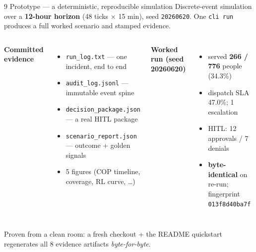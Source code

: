 \documentclass[aspectratio=169,11pt]{beamer}
\begin{document}
\begin{frame}{9 \;\; Prototype --- a deterministic, reproducible simulation}
  \small
  Discrete-event simulation over a \textbf{12-hour horizon} (48 ticks $\times$ 15 min), seed
  \texttt{20260620}. One \texttt{cli run} produces a full worked scenario and stamped evidence.
  \begin{columns}[T]
    \textbf{Committed evidence}
    \begin{itemize}\footnotesize
      \item \texttt{run\_log.txt} --- one incident, end to end
      \item \texttt{audit\_log.jsonl} --- immutable event spine
      \item \texttt{decision\_package.json} --- a real HITL package
      \item \texttt{scenario\_report.json} --- outcome + golden signals
      \item 5 figures (COP timeline, coverage, RL curve, \dots)
    \end{itemize}
    \textbf{Worked run (seed 20260620)}
    \begin{itemize}\footnotesize
      \item served \textbf{266 / 776} people (34.3\%)
      \item dispatch SLA 47.0\%; 1 escalation
      \item HITL: 12 approvals / 7 denials
      \item \textbf{byte-identical} on re-run; fingerprint \texttt{013f8d40ba7f}
    \end{itemize}
  \end{columns}
  \vspace{0.3em}
  \footnotesize Proven from a clean room: a fresh checkout + the README quickstart regenerates all 8
  evidence artifacts \emph{byte-for-byte}.
\end{frame}
\end{document}
